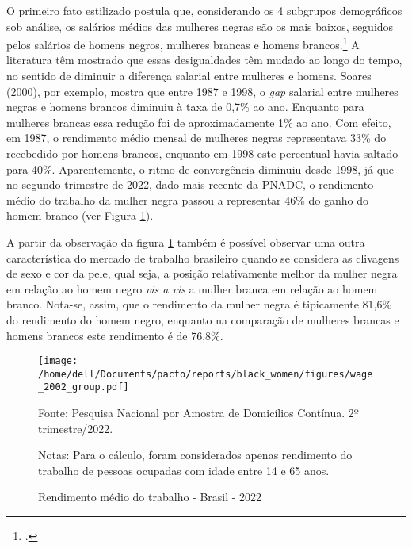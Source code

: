 \documentclass[12pt]{article}
\begin{document}
\par O primeiro fato estilizado postula que, considerando os 4 subgrupos de\-mo\-grá\-fi\-cos sob análise, os salários médios das mulheres negras são os mais baixos, seguidos pelos salários de homens negros, mulheres brancas e homens brancos.\footcite{soares2000perfil,campante2004desigualdade} A literatura têm mostrado que essas desigualdades têm mudado ao longo do tempo, no sentido de diminuir a diferença salarial entre mulheres e homens. Soares (2000), por exemplo, mostra que entre 1987 e 1998, o \textit{gap} salarial entre mulheres negras e homens brancos diminuiu à taxa de 0,7\% ao ano. Enquanto para mulheres brancas essa redução foi de aproximadamente 1\% ao ano. Com efeito, em 1987, o rendimento médio mensal de mulheres negras representava 33\% do recebedido por homens brancos, enquanto em 1998 este percentual havia saltado para 40\%. Aparentemente, o ritmo de convergência diminuiu desde 1998, já que no segundo trimestre de 2022, dado mais recente da PNADC, o rendimento médio do trabalho da mulher negra passou a representar 46\% do ganho do homem branco (ver Figura \ref{fig:rendimento_trabalho}). 

\par A partir da observação da figura \ref{fig:rendimento_trabalho} também é possível observar uma outra característica do mercado de trabalho brasileiro quando se considera as clivagens de sexo e cor da pele, qual seja, a posição relativamente melhor da mulher negra em relação ao homem negro \textit{vis a vis} a mulher branca em relação ao homem branco. Nota-se, assim, que o rendimento da mulher negra é tipicamente 81,6\% do rendimento do homem negro, enquanto na comparação de mulheres brancas e homens brancos este rendimento é de 76,8\%.


\begin{figure}[H]
    \centering
    \caption{Rendimento médio do trabalho - Brasil - 2022}
        \texttt{[image: /home/dell/Documents/pacto/reports/black\_women/figures/wage\_2002\_group.pdf]}
    \label{fig:rendimento_trabalho}
    \begin{floatnotes}
        \item[Fonte:] Pesquisa Nacional por Amostra de Domicílios Contínua. 2º trimestre/2022.
        \item[Notas:] Para o cálculo, foram considerados apenas rendimento do trabalho de pessoas ocupadas com idade entre 14 e 65 anos.
    \end{floatnotes}
\end{figure}
\end{document}
